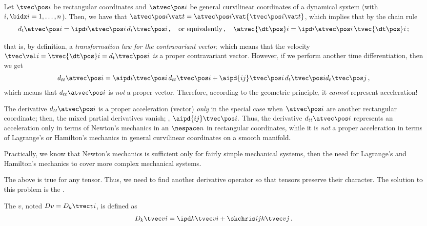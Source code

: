 \begin{example}
  Let $\tvec\pos i$ be rectangular coordinates and $\atvec\pos i$ be general curvilinear coordinates of a dynamical system (with $i,\bidx i = 1,\dotsc,n$). Then, we have that $\atvec\pos i\vat t = \atvec\pos i\vat{\tvec\pos i\vat t}$, which implies that by the chain rule
  \begin{equation*}
    d_t\atvec\pos i = \ipd i\atvec\pos i\,d_t\tvec\pos i\,,\quad\text{or equivalently}\,,\quad
    \atvec{\dt\pos}i = \ipd i\atvec\pos i\,\tvec{\dt\pos}i\,;
  \end{equation*}
\end{example}
%
that is, by definition, a \emph{transformation law for the contravariant vector}, which means that the velocity $\tvec\vel i = \tvec{\dt\pos} i = d_t\tvec\pos i$ \emph{is} a proper contravariant vector. However, if we perform another time differentiation, then we get
%
\begin{equation*}
  d_{tt}\atvec\pos i = \aipd i\tvec\pos i\,d_{tt}\tvec\pos i + \aipd{ij}\tvec\pos i\,d_t\tvec\pos i d_t\tvec\pos j\,,
\end{equation*}
%
which means that $d_{tt}\atvec\pos i$ is \emph{not} a proper vector. Therefore, according to the geometric principle, it \emph{cannot} represent acceleration!

The derivative $d_{tt}\atvec\pos i$ is a proper acceleration (vector) \emph{only} in the special case when $\atvec\pos i$ are another rectangular coordinate; then, the mixed partial derivatives vanish; \ie, $\aipd{ij}\tvec\pos i$. Thus, the derivative $d_{tt}\atvec\pos i$ represents an acceleration only in terms of Newton's mechanics in an $\nespace n$ in rectangular coordinates, while it is \emph{not} a proper acceleration in terms of Lagrange's or Hamilton's mechanics in general curvilinear coordinates on a smooth manifold.

\begin{note}
  Practically, we know that Newton's mechanics is sufficient only for fairly simple mechanical systems, then the need for Lagrange's and Hamilton's mechanics to cover more complex mechanical systems.
\end{note}

The above is true for any tensor. Thus, we need to find another derivative operator so that tensors preserve their character. The solution to this problem is the .

The  $v$, noted $Dv = D_k\tvec vi$, is defined as
%
\begin{equation*}
  D_k\tvec vi = \ipd k\tvec vi + \skchris ijk \tvec vj\,.
\end{equation*}

